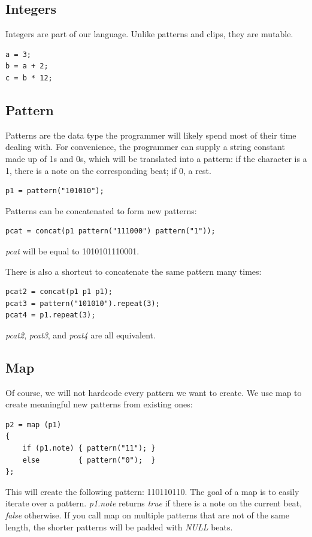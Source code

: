 \documentclass[11pt,twoside]{article}
\begin{document}
\subsection{Integers}
Integers are part of our language. Unlike patterns and clips, they are mutable.
\begin{verbatim}
a = 3;
b = a + 2;
c = b * 12;
\end{verbatim}

\subsection{Pattern}
Patterns are the data type the programmer will likely spend most of their time dealing with.  For convenience, the programmer can supply a string constant made up of 1s and 0s, which will be translated into a pattern: if the character is a 1, there is a note on the corresponding beat; if 0, a rest.
\begin{verbatim}
p1 = pattern("101010");
\end{verbatim}
Patterns can be concatenated to form new patterns:
\begin{verbatim}
pcat = concat(p1 pattern("111000") pattern("1"));
\end{verbatim}
\textit{pcat} will be equal to 1010101110001.

There is also a shortcut to concatenate the same pattern many times:
\begin{verbatim}
pcat2 = concat(p1 p1 p1);
pcat3 = pattern("101010").repeat(3);
pcat4 = p1.repeat(3);
\end{verbatim}
\textit{pcat2}, \textit{pcat3}, and \textit{pcat4} are all equivalent.

\subsection{Map}
Of course, we will not hardcode every pattern we want to create. We use
map to create meaningful new patterns from existing ones:
\begin{verbatim}
p2 = map (p1)
{
    if (p1.note) { pattern("11"); }
    else         { pattern("0");  }
};
\end{verbatim}
This will create the following pattern: 110110110. The goal of a map
is to easily iterate over a pattern. \textit{p1.note} returns
\textit{true} if there is a note on the current beat, \textit{false} otherwise.
If you call map on multiple patterns that are not of the same length,
the shorter patterns will be padded with \textit{NULL} beats.\\
\end{document}
